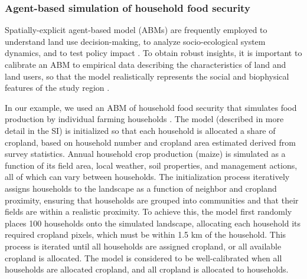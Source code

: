 \documentclass[12 pt, titlepage, a4paper]{article}
\begin{document}
\subsubsection*{Agent-based simulation of household food security }
\vspace{-0.2 cm}
Spatially-explicit agent-based model (ABMs) are frequently employed to understand land use decision-making, to analyze socio-ecological system dynamics, and to test policy impact \citep{berger_creating_2006}. To obtain robust insights, it is important to calibrate an ABM to empirical data describing the characteristics of land and land users, so that the model realistically represents the social and biophysical features of the study region \citep{berger_creating_2006}. 

In our example, we used an ABM of household food security that simulates food production by individual farming households \citep[the agents; ][]{chen_dependency_2013}. The model (described in more detail in the SI) is initialized so that each household is allocated a share of cropland, based on household number and cropland area estimated derived from survey statistics. Annual household crop production (maize) is simulated as a function of its field area, local weather, soil properties, and management actions, all of which can vary between households. The initialization process iteratively assigns households to the landscape as a function of neighbor and cropland proximity, ensuring that households are grouped into communities and that their fields are within a realistic proximity. To achieve this, the model first randomly places 100 households onto the simulated landscape, allocating each household its required cropland pixels, which must be within 1.5 km of the household. This process is iterated until all households are assigned cropland, or all available cropland is allocated. The model is considered to be well-calibrated when all households are allocated cropland, and all cropland is allocated to households. 
\end{document}
